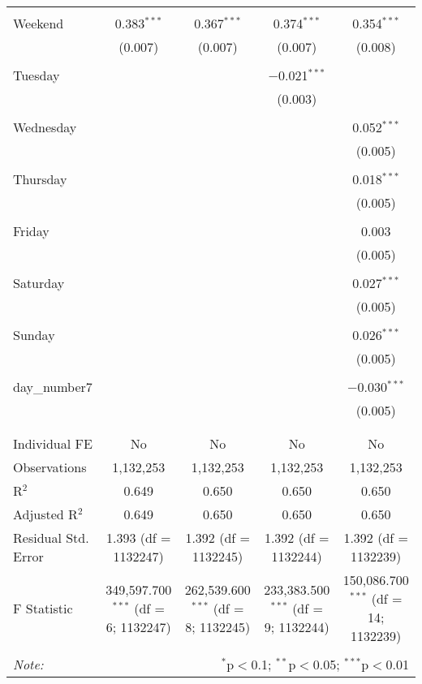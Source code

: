 \documentclass[
]{article}
\begin{document}
\begin{table}[!htbp]
{\begin{tabular}{@{\extracolsep{5pt}}lcccc}
  & & & & \\ 
 Weekend & 0.383$^{***}$ & 0.367$^{***}$ & 0.374$^{***}$ & 0.354$^{***}$ \\ 
  & (0.007) & (0.007) & (0.007) & (0.008) \\ 
  & & & & \\ 
 Tuesday &  &  & $-$0.021$^{***}$ &  \\ 
  &  &  & (0.003) &  \\ 
  & & & & \\ 
 Wednesday &  &  &  & 0.052$^{***}$ \\ 
  &  &  &  & (0.005) \\ 
  & & & & \\ 
 Thursday &  &  &  & 0.018$^{***}$ \\ 
  &  &  &  & (0.005) \\ 
  & & & & \\ 
 Friday &  &  &  & 0.003 \\ 
  &  &  &  & (0.005) \\ 
  & & & & \\ 
 Saturday &  &  &  & 0.027$^{***}$ \\ 
  &  &  &  & (0.005) \\ 
  & & & & \\ 
 Sunday &  &  &  & 0.026$^{***}$ \\ 
  &  &  &  & (0.005) \\ 
  & & & & \\ 
 day\_number7 &  &  &  & $-$0.030$^{***}$ \\ 
  &  &  &  & (0.005) \\ 
  & & & & \\ 
\hline \\[-1.8ex] 
Individual FE & No & No & No & No \\ 
Observations & 1,132,253 & 1,132,253 & 1,132,253 & 1,132,253 \\ 
R$^{2}$ & 0.649 & 0.650 & 0.650 & 0.650 \\ 
Adjusted R$^{2}$ & 0.649 & 0.650 & 0.650 & 0.650 \\ 
Residual Std. Error & 1.393 (df = 1132247) & 1.392 (df = 1132245) & 1.392 (df = 1132244) & 1.392 (df = 1132239) \\ 
F Statistic & 349,597.700$^{***}$ (df = 6; 1132247) & 262,539.600$^{***}$ (df = 8; 1132245) & 233,383.500$^{***}$ (df = 9; 1132244) & 150,086.700$^{***}$ (df = 14; 1132239) \\ 
\hline 
\hline \\[-1.8ex] 
\textit{Note:}  & \multicolumn{4}{r}{$^{*}$p$<$0.1; $^{**}$p$<$0.05; $^{***}$p$<$0.01} \\ 
\end{tabular}
} 
\end{table} 
\newpage
\end{document}
